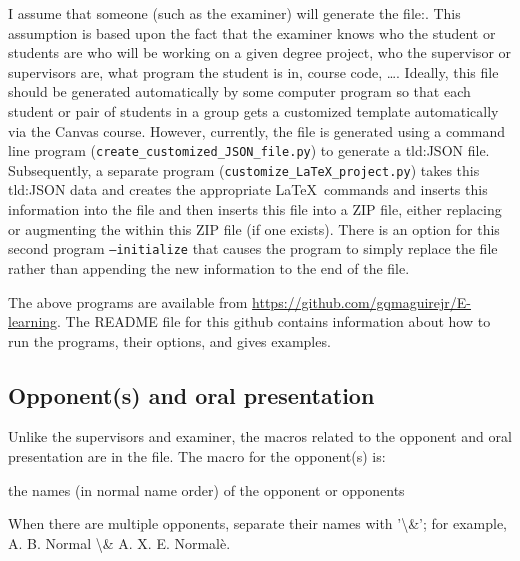 I assume that someone (such as the examiner) will generate the file:\linebreak[4] . This assumption is based upon the fact that the examiner knows who the student or students are who will be working on a given degree project, who the supervisor or supervisors are, what program the student is in, course code, \ldots . Ideally, this file should be generated automatically by some computer program so that each student or pair of students in a group gets a customized template automatically via the Canvas course. However, currently, the file is generated using a command line program (\texttt{create\_customized\_JSON\_file.py}) to generate a \gls{tld:JSON} file. Subsequently, a separate program (\texttt{customize\_LaTeX\_project.py}) takes this \gls{tld:JSON} data and creates the appropriate \LaTeX\ commands and inserts this information into the file and then inserts this file into a ZIP file, either replacing or augmenting the  within this ZIP file (if one exists). There is an option for this second program \texttt{--initialize} that causes the program to simply replace the file rather than appending the new information to the end of the file.

The above programs are available from \url{https://github.com/gqmaguirejr/E-learning}. The README file for this github contains information about how to run the programs, their options, and gives examples.

\subsection{Opponent(s) and oral presentation}
\label{sec:opponentMacros}
Unlike the supervisors and examiner, the macros related to the opponent and oral presentation are in the  file.
The macro for the opponent(s) is: 
\begin{description}[leftmargin=!, labelwidth =\widthof{\texttt{\textbackslash secondAuthorsFirstname\{\}}}]
\item [\texttt{\textbackslash opponentsNames\{\}}] the names (in normal name order) of the opponent or opponents
\end{description}
When there are multiple opponents, separate their names with '\textbackslash \&'; for example, A. B. Normal \textbackslash \& A. X. E. Normalè.

